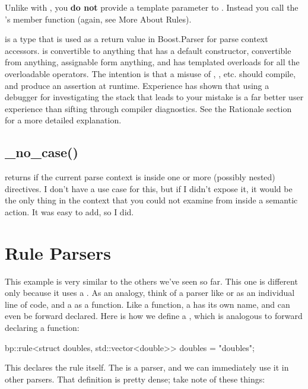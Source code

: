 \documentclass{MyBook}
\begin{document}
Unlike with , you \textbf{do not} provide a template parameter to . Instead you call the 's  member function (again, see More About Rules).

\begin{marker}[title=Note ]
 is a type that is used as a return value in Boost.Parser for parse context accessors.  is convertible to anything that has a default constructor, convertible from anything, assignable form anything, and has templated overloads for all the overloadable operators. The intention is that a misuse of , , etc. should compile, and produce an assertion at runtime. Experience has shown that using a debugger for investigating the stack that leads to your mistake is a far better user experience than sifting through compiler diagnostics. See the Rationale section for a more detailed explanation. 
\end{marker}

\subsection{{}{\_no\_case()}}

 returns  if the current parse context is inside one or more (possibly nested)  directives. I don't have a use case for this, but if I didn't expose it, it would be the only thing in the context that you could not examine from inside a semantic action. It was easy to add, so I did.

\section{Rule Parsers}

This example is very similar to the others we've seen so far. This one is different only because it uses a . As an analogy, think of a parser like  or  as an individual line of code, and a  as a function. Like a function, a  has its own name, and can even be forward declared. Here is how we define a , which is analogous to forward declaring a function:

\begin{code}
bp::rule<struct doubles, std::vector<double>> doubles = "doubles";
\end{code}

This declares the rule itself. The  is a parser, and we can immediately use it in other parsers. That definition is pretty dense; take note of these things:
\end{document}
